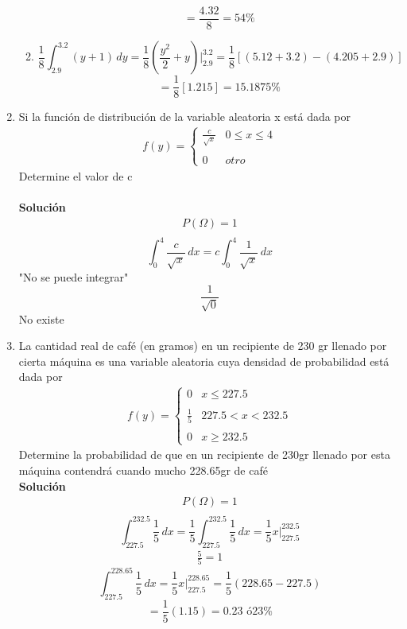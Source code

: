 \begin{enumerate}
\begin{enumerate}
\[    \]
    \[=\frac{4.32}{8}=54\% 
        \]
        \item \[\frac{1}{8}\int_{2.9}^{3.2}  \! (y+1) \, dy =\frac{1}{8}(\frac{y^2}{2}+y)|_2.9^3.2 = \frac{1}{8}[(5.12+3.2)-(4.205+2.9)]
    \]
    \[=\frac{1}{8}[1.215]=15.1875\% 
        \]
        \end{enumerate}
	\item Si la función de distribución de la variable aleatoria x está dada por
	\begin{gather*}
	    f(y)= \left\{ \begin{array}{lcc}
             \frac{c}{\sqrt{x}} & 0 \leq x \leq 4\\
             \\ 0 & otro 
             \end{array}
   \right.
	\end{gather*}
	Determine el valor de c\\
    \\\textbf{Solución}
    \\
    \begin{gather*}
        P(\Omega)=1\\ 
    \end{gather*}
       \[ \int_{0}^{4}  \! \frac{c}{\sqrt{x}} \, dx =
        c\int_{0}^{4}  \! \frac{1}{\sqrt{x}} \, dx 
        \]
    "No se puede integrar"
    \[ \frac{1}{\sqrt{0}}
    \] No existe
	\item La cantidad real de café (en gramos) en un recipiente de 230 gr llenado por cierta máquina es una variable aleatoria cuya densidad de probabilidad está dada por
	\begin{gather*}
	    f(y)= \left\{ \begin{array}{lcc}
             0 & x \leq 227.5\\
             \\ \frac{1}{5} & 227.5 < x < 232.5 \\
             \\ 0 & x \geq 232.5
             \end{array}
   \right.
	\end{gather*}
	Determine la probabilidad de que en un recipiente de 230gr llenado por esta máquina contendrá cuando mucho 228.65gr de café
    \\\textbf{Solución}
     \\
    \begin{gather*}
        P(\Omega)=1\\ 
    \end{gather*}
       \[ \int_{227.5}^{232.5}  \! \frac{1}{5} \, dx =
        \frac{1}{5}\int_{227.5}^{232.5}  \! \frac{1}{5} \, dx = \frac{1}{5}x |_{227.5}^{232.5}
        \] 
    \begin{gather*}
    \frac{5}{5}=1
    \end{gather*}
   \[ \int_{227.5}^{228.65}  \! \frac{1}{5} \, dx = \frac{1}{5}x |_{227.5}^{228.65} = \frac{1}{5}(228.65-227.5)
        \] 
    \[=\frac{1}{5}(1.15)= 0.23 \text{ ó} 23\% 
        \]
\end{enumerate}
